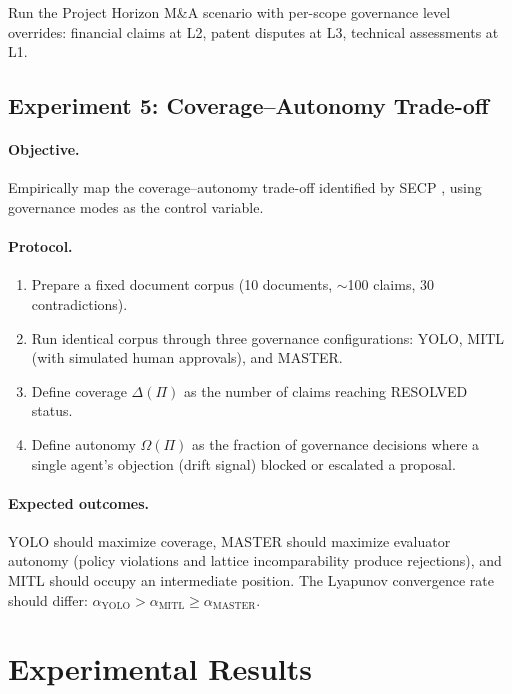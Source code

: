\documentclass[11pt]{article}
\begin{document}
Run the Project Horizon M\&A scenario with per-scope governance level overrides: financial claims at L2, patent disputes at L3, technical assessments at L1.

\subsection{Experiment 5: Coverage--Autonomy Trade-off}

\paragraph{Objective.} Empirically map the coverage--autonomy trade-off identified by SECP \cite{delachica2026}, using governance modes as the control variable.

\paragraph{Protocol.}
\begin{enumerate}
  \item Prepare a fixed document corpus (10 documents, $\sim$100 claims, 30 contradictions).
  \item Run identical corpus through three governance configurations: YOLO, MITL (with simulated human approvals), and MASTER.
  \item Define coverage $\Delta(\Pi)$ as the number of claims reaching RESOLVED status.
  \item Define autonomy $\Omega(\Pi)$ as the fraction of governance decisions where a single agent's objection (drift signal) blocked or escalated a proposal.
\end{enumerate}

\paragraph{Expected outcomes.} YOLO should maximize coverage, MASTER should maximize evaluator autonomy (policy violations and lattice incomparability produce rejections), and MITL should occupy an intermediate position. The Lyapunov convergence rate should differ: $\alpha_{\text{YOLO}} > \alpha_{\text{MITL}} \geq \alpha_{\text{MASTER}}$.

\section{Experimental Results}
\label{sec:results}
\end{document}

